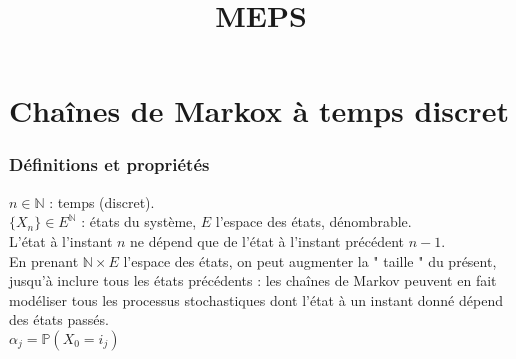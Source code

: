 \documentclass[10pt,a4paper]{article}
\title{MEPS}
\newcommand{\N}{\mathbb{N}}
\newcommand{\Prob}{\mathbb{P}}
\begin{document}
\part{Chaînes de Markox à temps discret}
\section{Définitions et propriétés}
$n \in \N$ : temps (discret).\\
$ \{ X_n \} \in E^{\N} $ : états du système, $E$ l'espace des états, dénombrable.\\
L'état à l'instant $n$ ne dépend que de l'état à l'instant précédent $n-1$.\\

En prenant $\N \times E$ l'espace des états, on peut augmenter la " taille " du présent, jusqu'à inclure tous les états précédents : les chaînes de Markov peuvent en fait modéliser tous les processus stochastiques dont l'état à un instant donné dépend des états passés.\\
 
$\alpha_j = \Prob(X_0 = i_j)$\\


\end{document}
